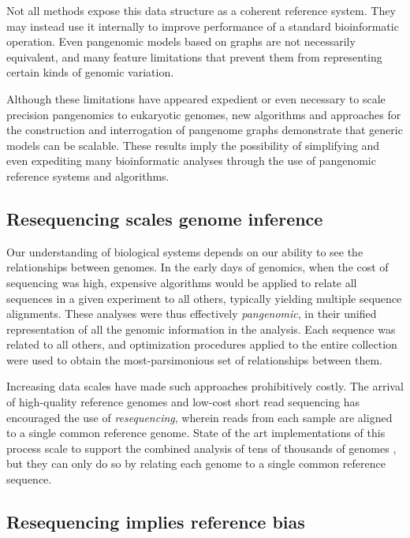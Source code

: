 Not all methods expose this data structure as a coherent reference system.
They may instead use it internally to improve performance of a standard bioinformatic operation.
Even pangenomic models based on graphs are not necessarily equivalent, and many feature limitations that prevent them from representing certain kinds of genomic variation.

Although these limitations have appeared expedient or even necessary to scale precision pangenomics to eukaryotic genomes, new algorithms and approaches for the construction and interrogation of pangenome graphs demonstrate that generic models can be scalable.
These results imply the possibility of simplifying and even expediting many bioinformatic analyses through the use of pangenomic reference systems and algorithms.

\subsection{Resequencing scales genome inference}

Our understanding of biological systems depends on our ability to see the relationships between genomes.
In the early days of genomics, when the cost of sequencing was high, expensive algorithms would be applied to relate all sequences in a given experiment to all others, typically yielding multiple sequence alignments.
These analyses were thus effectively \emph{pangenomic}, in their unified representation of all the genomic information in the analysis.
Each sequence was related to all others, and optimization procedures applied to the entire collection were used to obtain the most-parsimonious set of relationships between them.

Increasing data scales have made such approaches prohibitively costly.
The arrival of high-quality reference genomes and low-cost short read sequencing has encouraged the use of \emph{resequencing}, wherein reads from each sample are aligned to a single common reference genome.
State of the art implementations of this process scale to support the combined analysis of tens of thousands of genomes \cite{Poplin_2017}, but they can only do so by relating each genome to a single common reference sequence.

\subsection{Resequencing implies reference bias}

